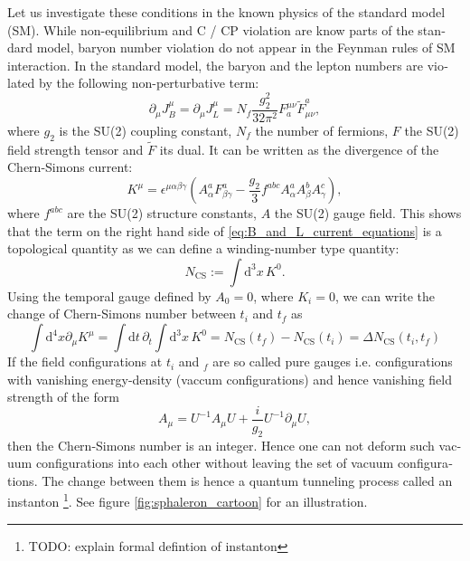 \documentclass[master,       %
               twoside,        %
               BCOR10mm,       %
               english,ngerman, %
               ]{GAUBM}
\begin{document}
\begin{otherlanguage}{english}
Let us investigate these conditions in the known physics of the standard model (SM). While non-equilibrium and C / CP violation are know parts of the standard model, baryon number violation do not appear in the Feynman rules of SM interaction. In the standard model, the baryon and the lepton numbers are violated by the following non-perturbative term:
\begin{equation}
	\label{eq:B_and_L_current_equations}
	\partial_\mu J^\mu_B = \partial_\mu J^\mu_L = N_f \frac{g_2^2}{32 \pi^2} F^{\mu \nu}_a \tilde{F}_{\mu \nu}^a,
\end{equation}
where $g_2$ is the SU(2) coupling constant, $N_f$ the number of fermions, $F$ the SU(2) field strength tensor and $\tilde{F}$ its dual.
It can be written as the divergence of the Chern-Simons current:
\begin{equation}
	\label{eq:chern_simons_current}
	K^\mu = \epsilon^{\mu \alpha \beta \gamma} \left( A^a_\alpha F^a_{\beta \gamma} - \frac{g_2}{3} f^{abc} A^a_\alpha A^b_\beta A^c_\gamma \right),
\end{equation}
where $f^{abc}$ are the SU(2) structure constants, $A$ the SU(2) gauge field.
This shows that the term on the right hand side of \eqref{eq:B_and_L_current_equations} is a topological quantity as we can define a winding-number type quantity:
\begin{equation}
	N_{\mathrm{CS}} := \int \mathrm{d}^3 x \, K^0.
\end{equation}
Using the temporal gauge defined by $A_0 = 0$, where $K_i = 0$,
we can write the change of Chern-Simons number between $t_i$ and $t_f$ as
\begin{equation}
	\int \mathrm{d}^4 x \partial_\mu K^\mu = \int \mathrm{d} t \, \partial_t \int \mathrm{d}^3 x \, K^0 =
	N_{\mathrm{CS}}(t_f) - N_{\mathrm{CS}}(t_i) = \Delta N_{\mathrm{CS}}(t_i, t_f)
\end{equation}
If the field configurations at $t_i$ and $_f$ are so called pure gauges i.e. configurations with vanishing energy-density (vaccum configurations) and hence vanishing field strength of the form
\begin{equation}
	A_\mu = U^{-1} A_\mu U + \frac{i}{g_2} U^{-1} \partial_\mu U,
\end{equation}
then the Chern-Simons number is an integer.
Hence one can not deform such vacuum configurations into each other without leaving the set of vacuum configurations.
The change between them is hence a quantum tunneling process called an instanton \footnote{TODO: explain formal defintion of instanton}. See figure \ref{fig:sphaleron_cartoon} for an illustration.

\end{otherlanguage}
\end{document}
